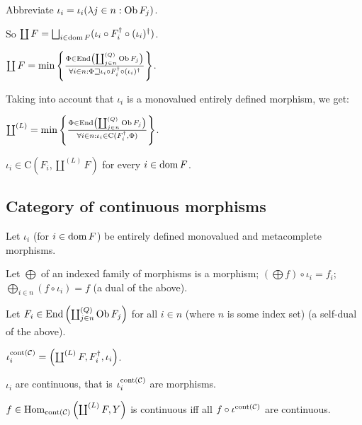 Abbreviate $\iota_i = \iota_i(\lambda j \in n : \operatorname{Ob} F_j)$.

So $\coprod F = \bigsqcup_{i \in \dom F} (\iota_i \circ F_i^{\dagger}
\circ (\iota_i)^{\dagger})$.

$\coprod F = \min \left\{ \frac{ \Phi \in \operatorname{End} \left( \coprod^{(Q)}_{j \in n}
\operatorname{Ob} F_j \right) }{ \forall i \in n : \Phi
\sqsupseteq \iota_i \circ F_i^{\dagger} \circ (\iota_i)^{\dagger} }\right\}$.

Taking into account that $\iota_i$ is a monovalued entirely defined morphism,
we get:

\begin{obvious}
$\coprod^{(L)} = \min \left\{ \frac{ \Phi \in \operatorname{End} \left( \coprod^{(Q)}_{j \in
n} \operatorname{Ob} F_j \right) }{ \forall i \in n : \iota_i
\in \mathrm{C} (F_i^{\dagger} , \Phi) }\right\}$.{\hspace*{\fill}}{\medskip}
\end{obvious}

\begin{cor}
  $\iota_i \in \mathrm{C} \left( F_i , \coprod^{(L)} F \right)$ for every $i
  \in \operatorname{dom} F$.
\end{cor}

\subsection{Category of continuous morphisms}

Let $\iota_i$ (for $i \in \operatorname{dom} F$) be entirely defined monovalued and
metacomplete morphisms.

Let $\bigoplus$ of an indexed family of morphisms is a morphism; $\left(
\bigoplus f \right) \circ \iota_i = f_i$; $\bigoplus_{i \in n} (f \circ
\iota_i) = f$ (a dual of the above).

Let $F_i \in \operatorname{End} \left( \coprod^{(Q)}_{j \in n} \operatorname{Ob} F_j \right)$
for all $i \in n$ (where $n$ is some index set) (a self-dual of the above).

\begin{defn}
  $\iota^{\operatorname{cont} (\mathcal{C})}_i = \left( \coprod^{(L)} F ,
  F_i^{\dagger} , \iota_i \right)$.
\end{defn}

\begin{prop}
  $\iota_i$ are continuous, that is $\iota^{\operatorname{cont}
  (\mathcal{C})}_i$ are morphisms.
\end{prop}

\begin{lem}
  $f \in \operatorname{Hom}_{\operatorname{cont} (\mathcal{C})} \left(
  \coprod^{(L)} F , Y \right)$  is continuous iff all $f \circ
  \iota^{\operatorname{cont} (\mathcal{C})}$ are continuous.
\end{lem}

